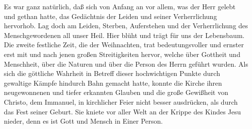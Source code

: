 Es war ganz natürlich, daß sich von Anfang an vor allem, was der Herr gelebt und gethan hatte, das Gedächtnis der Leiden und seiner Verherrlichung hervorhob. Lag doch am Leiden, Sterben, Auferstehen und der Verherrlichung des Menschgewordenen all unser Heil. Hier blüht und trägt für uns der Lebensbaum. Die zweite festliche Zeit, die der Weihnachten, trat bedeutungsvoller und ernster erst mit und nach jenen großen Streitigkeiten hervor, welche über Gottheit und Menschheit, über die Naturen und über die Person des Herrn geführt wurden. Als sich die göttliche Wahrheit in Betreff dieser hochwichtigen Punkte durch gewaltige Kämpfe
hindurch Bahn gemacht hatte, konnte die Kirche ihren neugewonnenen und tiefer erkannten Glauben und die große Gewißheit von Christo, dem Immanuel, in kirchlicher Feier nicht besser ausdrücken, als durch das Fest seiner Geburt. Sie kniete vor aller Welt an der Krippe des Kindes Jesu nieder, denn es ist Gott und Mensch in Einer Person.

